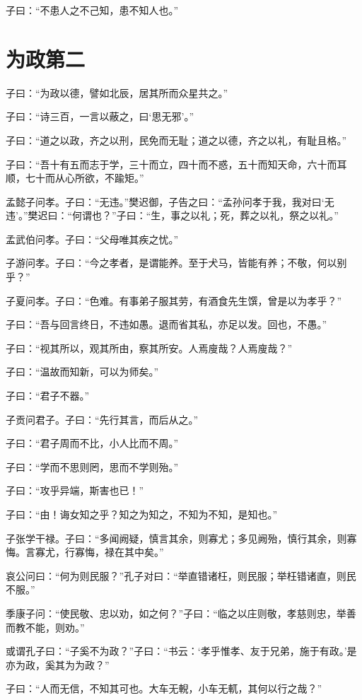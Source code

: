 \documentclass[twoside,openany]{book}
\begin{document}
子曰：“不患人之不己知，患不知人也。”


\chapter{为政第二}\label{ch2}

子曰：“为政以德，譬如北辰，居其所而众星共之。”

子曰：“诗三百，一言以蔽之，曰‘思无邪’。”

子曰：“道之以政，齐之以刑，民免而无耻；道之以德，齐之以礼，有耻且格。”

子曰：“吾十有五而志于学，三十而立，四十而不惑，五十而知天命，六十而耳顺，七十而从心所欲，不踰矩。”

孟懿子问孝。子曰：“无违。”樊迟御，子告之曰：“孟孙问孝于我，我对曰‘无违’。”樊迟曰：“何谓也？”子曰：“生，事之以礼；死，葬之以礼，祭之以礼。”

孟武伯问孝。子曰：“父母唯其疾之忧。”

子游问孝。子曰：“今之孝者，是谓能养。至于犬马，皆能有养；不敬，何以别乎？”

子夏问孝。子曰：“色难。有事弟子服其劳，有酒食先生馔，曾是以为孝乎？”

子曰：“吾与回言终日，不违如愚。退而省其私，亦足以发。回也，不愚。”

子曰：“视其所以，观其所由，察其所安。人焉廋哉？人焉廋哉？”

子曰：“温故而知新，可以为师矣。”

子曰：“君子不器。”

子贡问君子。子曰：“先行其言，而后从之。”

子曰：“君子周而不比，小人比而不周。”

子曰：“学而不思则罔，思而不学则殆。”

子曰：“攻乎异端，斯害也已！”

子曰：“由！诲女知之乎？知之为知之，不知为不知，是知也。”

子张学干禄。子曰：“多闻阙疑，慎言其余，则寡尤；多见阙殆，慎行其余，则寡悔。言寡尤，行寡悔，禄在其中矣。”

哀公问曰：“何为则民服？”孔子对曰：“举直错诸枉，则民服；举枉错诸直，则民不服。”

季康子问：“使民敬、忠以劝，如之何？”子曰：“临之以庄则敬，孝慈则忠，举善而教不能，则劝。”

或谓孔子曰：“子奚不为政？”子曰：“书云：‘孝乎惟孝、友于兄弟，施于有政。’是亦为政，奚其为为政？”

子曰：“人而无信，不知其可也。大车无輗，小车无軏，其何以行之哉？”
\end{document}
